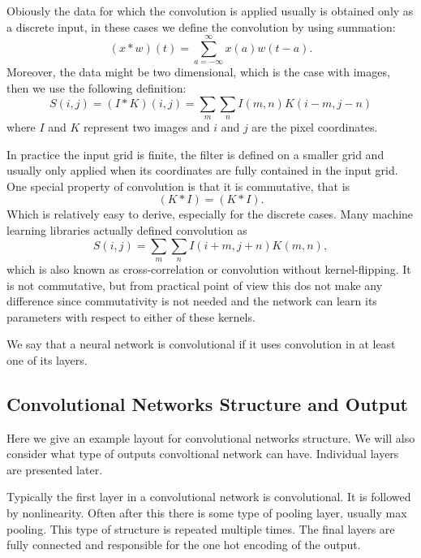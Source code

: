 \documentclass[]{article}
\begin{document}
Obiously the data for which the convolution is applied usually is obtained only
as a discrete input, in these cases we define the convolution by using
summation:
\[
(x * w)(t) = \sum_{a = -\infty}^{\infty} x(a)w(t - a).
\]
Moreover, the data might be two dimensional, which is the case with images, then
we use the following definition:
\[
S(i, j) = (I * K)(i, j) = \sum_m \sum_n I(m , n) K(i - m, j - n)
\]
where $I$ and $K$ represent two images and $i$ and $j$ are the pixel coordinates.

In practice the input grid is finite, the filter is defined on a smaller grid and
usually only applied when its coordinates are fully contained in the input grid.
One special property of convolution is that it is commutative, that is
\[
 (K * I) = (K * I).
\]
Which is relatively easy to derive, especially for the discrete cases. Many machine
learning libraries actually defined convolution as
\[
S(i, j) = \sum_m \sum_n I(i + m , j + n) K(m, n),
\]
which is also known as cross-correlation or convolution without kernel-flipping.
It is not commutative, but from practical point of view this dos not make any difference
since commutativity is not needed and the network can learn its parameters with
respect to either of these kernels.

We say that a neural network is convolutional if it uses convolution in at least
one of its layers.


\subsection{Convolutional Networks Structure and Output}
Here we give an example layout for convolutional networks structure. We will also
consider what type of outputs convoltional network can have. Individual layers are
presented later.

Typically the first layer in a convolutional network is convolutional. It is followed
by nonlinearity. Often after this there is some type of pooling layer, usually max
pooling. This type of structure is repeated multiple times. The final layers are
fully connected and responsible for the one hot encoding of the output.
\end{document}
